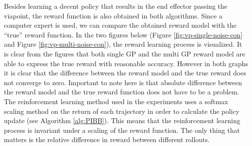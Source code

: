 \documentclass[mscThesis.tex]{subfiles}
\begin{document}
Besides learning a decent policy that results in the end effector passing the viapoint, the reward function is also obtained in both algorithms. Since a computer expert is used, we can compare the obtained reward model with the ``true'' reward function. In the two figures below (Figure \ref{fig:vp-single-noise-con} and Figure \ref{fig:vp-multi-noise-con}), the reward learning process is visualized. It is clear from the figures that both single GP and the multi GP reward model are able to express the true reward with reasonable accuracy. However in both graphs it is clear that the difference between the reward model and the true reward does not converge to zero. Important to note here is that absolute difference between the reward model and the true reward function does not have to be a problem. The reinforcement learning method used in the experiments uses a softmax scaling method on the return of each trajectory in order to calculate the policy update (see Algorithm \ref{alg:PIBB}). This means that the reinforcement learning process is invariant under a scaling of the reward function. The only thing that matters is the relative difference in reward between different rollouts. 
\end{document}
